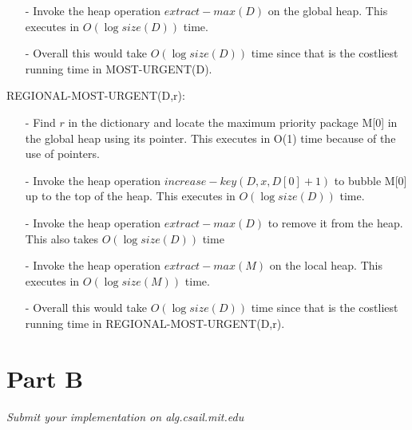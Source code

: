 \documentclass[12pt,twoside]{article}
\begin{document}
\begin{problems}
\begin{itemize}
	\item[- ] Invoke the heap operation $ extract-max(D) $ on the global heap. This executes in $O(\log size(D))$ time.
	
	\item[- ] Overall this would take $O(\log size(D))$ time since that is the costliest running time in MOST-URGENT(D).
\end{itemize}

REGIONAL-MOST-URGENT(D,r): 
\begin{itemize}
	\item[- ] Find $ r $ in the dictionary and locate the maximum priority package M[0] in the global heap using its pointer. This executes in O(1) time because of the use of pointers.

	\item[- ] Invoke the heap operation $ increase-key(D,x,D[0]+1) $ to bubble M[0] up to the top of the heap. This executes in $O(\log size(D))$ time.
	 
	\item[- ] Invoke the heap operation $ extract-max(D) $ to remove it from the heap. This also takes $O(\log size(D))$ time   
	
	\item[- ] Invoke the heap operation $ extract-max(M) $ on the local heap. This executes in $O(\log size(M))$ time.
	
	\item[- ] Overall this would take $O(\log size(D))$ time since that is the costliest running time in REGIONAL-MOST-URGENT(D,r).
	
	
\end{itemize}



\section*{Part B}

\problem
\begin{problemparts}
\problempart \emph{Submit your implementation on alg.csail.mit.edu}
\end{problemparts}

\end{problems}
\end{document}
